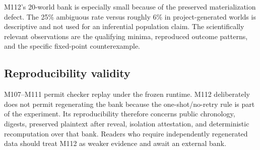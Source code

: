 M112's 20-world bank is especially small because of the preserved materialization defect. The 25\% ambiguous rate versus roughly 6\% in project-generated worlds is descriptive and not used for an inferential population claim. The scientifically relevant observations are the qualifying minima, reproduced outcome patterns, and the specific fixed-point counterexample.

\subsection{Reproducibility validity}
M107--M111 permit checker replay under the frozen runtime. M112 deliberately does not permit regenerating the bank because the one-shot/no-retry rule is part of the experiment. Its reproducibility therefore concerns public chronology, digests, preserved plaintext after reveal, isolation attestation, and deterministic recomputation over that bank. Readers who require independently regenerated data should treat M112 as weaker evidence and await an external bank.

